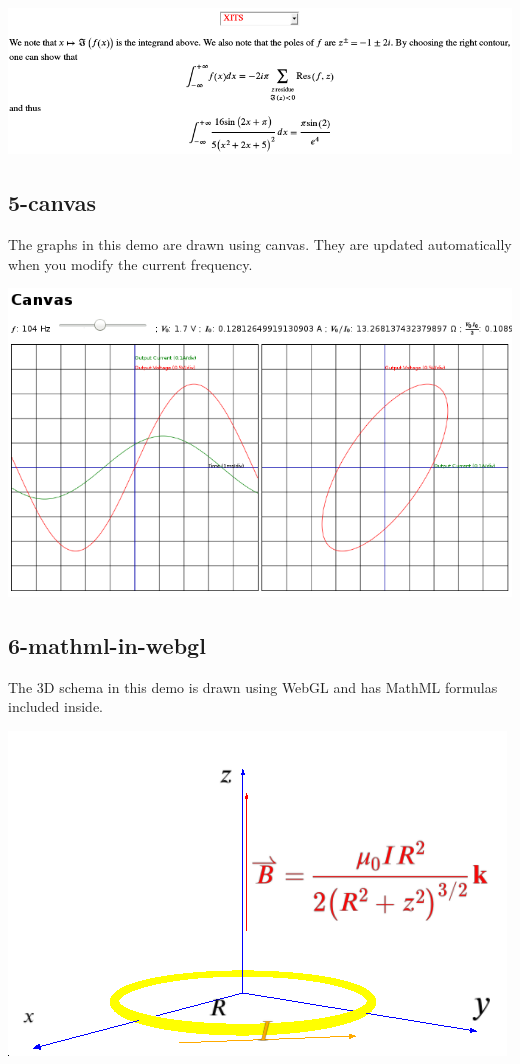 \includegraphics[width=\textwidth]{screenshots/4-mathml-fonts-xits}

\subsection{5-canvas}

The graphs in this demo are drawn using canvas. They are updated automatically
when you modify the current frequency.

\href{http://fred-wang.github.io/MathUI2014/demos/5-canvas.html}{\includegraphics[width=\textwidth]{screenshots/5-canvas}}

\subsection{6-mathml-in-webgl}

The 3D schema in this demo is drawn using WebGL and has MathML formulas
included inside.

\href{http://fred-wang.github.io/MathUI2014/demos/6-mathml-in-webgl}{\includegraphics{screenshots/6-mathml-in-webgl-1}}

